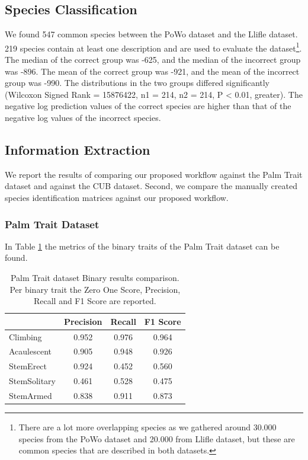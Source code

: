 \documentclass[a4paper, 12pt, oneside]{book} %
\begin{document}
\subsection{Species Classification}
We found 547 common species between the PoWo dataset and the Llifle dataset.
219 species contain at least one description and are used to evaluate the dataset\footnote{There are a lot more overlapping species as we gathered around 30.000 species from the PoWo dataset and 20.000 from Llifle dataset, but these are common species that are described in both datasets.}.
The median of the correct group was -625, and the median of the incorrect group was -896.
The mean of the correct group was -921, and the mean of the incorrect group was -990.
The distributions in the two groups differed significantly (Wilcoxon Signed Rank = 15876422, n1 = 214, n2 = 214, P < 0.01, greater).
The negative log prediction values of the correct species are higher than that of the negative log values of the incorrect species.


\subsection{Information Extraction}
We report the results of comparing our proposed workflow against the Palm Trait dataset and against the CUB dataset.
Second, we compare the manually created species identification matrices against our proposed workflow.

\subsubsection{Palm Trait Dataset}
In Table \ref{tab:palm_trait_binary} the metrics of the binary traits of the Palm Trait dataset can be found.
\begin{table}[htpb]
\centering
\caption[Palm Trait dataset Binary results comparison]{Palm Trait dataset Binary results comparison. Per binary trait the Zero One Score, Precision, Recall and F1 Score are reported.}
\label{tab:palm_trait_binary}
\begin{tabular}{@{}lccc@{}}
\cmidrule(l){2-4}
             & \textbf{Precision} & \textbf{Recall} & \textbf{F1 Score} \\ \midrule
Climbing     & 0.952              & 0.976           & 0.964             \\ \midrule
Acaulescent  & 0.905              & 0.948           & 0.926             \\ \midrule
StemErect    & 0.924              & 0.452           & 0.560             \\ \midrule
StemSolitary & 0.461              & 0.528           & 0.475             \\ \midrule
StemArmed    & 0.838              & 0.911           & 0.873             \\ \bottomrule
\end{tabular}
\end{table}
\end{document}

